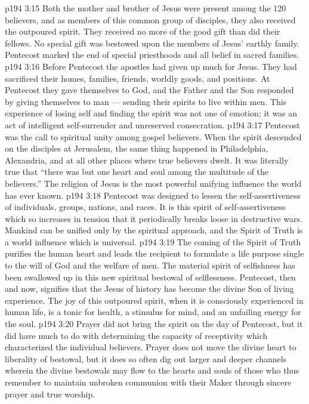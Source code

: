 \vs p194 3:15 \pc Both the mother and brother of Jesus were present among the 120 believers, and as members of this common group of disciples, they also received the outpoured spirit. They received no more of the good gift than did their fellows. No special gift was bestowed upon the members of Jesus’ earthly family. Pentecost marked the end of special priesthoods and all belief in sacred families.
\vs p194 3:16 \pc Before Pentecost the apostles had given up much for Jesus. They had sacrificed their homes, families, friends, worldly goods, and positions. At Pentecost they gave themselves to God, and the Father and the Son responded by giving themselves to man --- sending their spirits to live within men. This experience of losing self and finding the spirit was not one of emotion; it was an act of intelligent self\hyp{}surrender and unreserved consecration.
\vs p194 3:17 Pentecost was the call to spiritual unity among gospel believers. When the spirit descended on the disciples at Jerusalem, the same thing happened in Philadelphia, Alexandria, and at all other places where true believers dwelt. It was literally true that “there was but one heart and soul among the multitude of the believers.” The religion of Jesus is the most powerful unifying influence the world has ever known.
\vs p194 3:18 \pc Pentecost was designed to lessen the self\hyp{}assertiveness of individuals, groups, nations, and races. It is this spirit of self\hyp{}assertiveness which so increases in tension that it periodically breaks loose in destructive wars. Mankind can be unified only by the spiritual approach, and the Spirit of Truth is a world influence which is universal.
\vs p194 3:19 The coming of the Spirit of Truth purifies the human heart and leads the recipient to formulate a life purpose single to the will of God and the welfare of men. The material spirit of selfishness has been swallowed up in this new spiritual bestowal of selflessness. Pentecost, then and now, signifies that the Jesus of history has become the divine Son of living experience. The joy of this outpoured spirit, when it is consciously experienced in human life, is a tonic for health, a stimulus for mind, and an unfailing energy for the soul.
\vs p194 3:20 \pc Prayer did not bring the spirit on the day of Pentecost, but it did have much to do with determining the capacity of receptivity which characterized the individual believers. Prayer does not move the divine heart to liberality of bestowal, but it does so often dig out larger and deeper channels wherein the divine bestowals may flow to the hearts and souls of those who thus remember to maintain unbroken communion with their Maker through sincere prayer and true worship.
